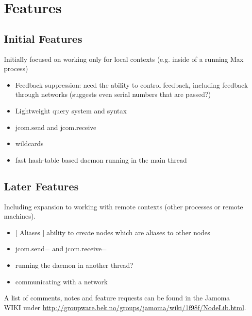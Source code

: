 \documentclass[]{article}
\begin{document}

\section{Features}

\subsection{Initial Features}

Initially focused on working only for local contexts (e.g. inside of a running Max process)

\begin{itemize}
	
	\item Feedback suppression: need the ability to control feedback, including feedback through networks (suggests even serial numbers that are passed?)

	\item Lightweight query system and syntax

	\item jcom.send and jcom.receive

	\item wildcards

	\item fast hash-table based daemon running in the main thread

\end{itemize}


\subsection{Later Features}

Including expansion to working with remote contexts (other processes or remote machines). 

\begin{itemize}

	\item {[ Aliases ] ability to create nodes which are aliases to other nodes}

	\item {jcom.send= and jcom.receive=}

	\item {running the daemon in another thread?}

	\item {communicating with a network}

\end{itemize}

A list of comments, notes and feature requests can be found in the Jamoma WIKI under \url{http://groupware.bek.no/groups/jamoma/wiki/1f98f/NodeLib.html}. 





\end{document}
